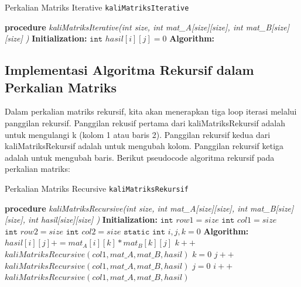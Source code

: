 \documentclass[conference]{IEEEtran}
\begin{document}
\begin{algorithm}
    \caption{Perkalian Matriks Iterative \texttt{kaliMatriksIterative} }\label{alg:one}
    \DontPrintSemicolon
    \textbf{procedure} \emph{kaliMatriksIterative(int size, int mat\_A[size][size], int mat\_B[size][size] )}\;
    \textbf{Initialization:}\;
    $\texttt{int } hasil[i][j] = 0$\;
    \textbf{Algorithm:}\;
\end{algorithm}

\subsection{Implementasi Algoritma Rekursif dalam Perkalian Matriks}
Dalam perkalian matriks rekursif, kita akan menerapkan tiga loop iterasi melalui panggilan
rekursif. Panggilan rekusif pertama dari kaliMatriksRekursif adalah untuk mengulangi k (kolom 1
atau baris 2). Panggilan rekursif kedua dari kaliMatriksRekursif adalah untuk mengubah kolom.
Panggilan rekursif ketiga adalah untuk mengubah baris. Berikut pseudocode algoritma rekursif
pada perkalian matriks:

\begin{algorithm}
    \caption{Perkalian Matriks Recursive \texttt{kaliMatriksRekursif} }\label{alg:two}
    \DontPrintSemicolon
    \textbf{procedure} \emph{kaliMatriksRecursive(int size, int mat\_A[size][size], int mat\_B[size][size], int hasil[size][size] )}\;
    \textbf{Initialization:}\;
    $ \texttt{int } row1 = size $\;
    $ \texttt{int } col1 = size $\;
    $ \texttt{int } row2 = size $\;
    $ \texttt{int } col2 = size $\;
    $ \texttt{static int } i, j, k= 0$\;
    \textbf{Algorithm:}\;
     {
         {
             {
                $hasil[i][j] += mat_A[i][k] * mat_B[k][j]$\;
                $k++$\;
                $kaliMatriksRecursive(col1, mat\_A, mat\_B, hasil)$\;
            }
            $k=0$\;
            $j++$\;
            $kaliMatriksRecursive(col1, mat\_A, mat\_B, hasil)$\;
        }
        $j=0$\;
        $i++$\;
        $kaliMatriksRecursive(col1, mat\_A, mat\_B, hasil)$\;
    } 
\end{algorithm}
\end{document}
